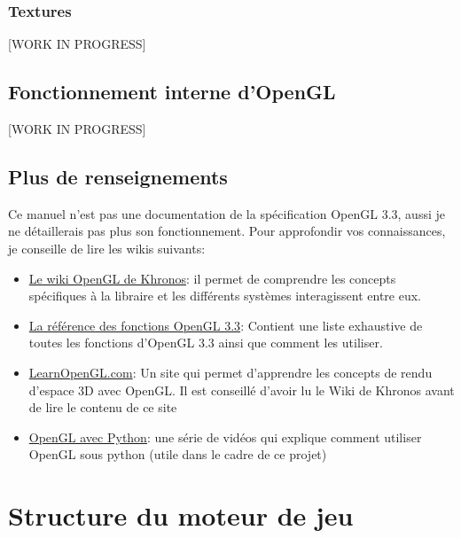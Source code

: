 \documentclass[a4paper,10pt]{article}
\begin{document}
\subsubsection{Textures}
[WORK IN PROGRESS]

\subsection{Fonctionnement interne d'OpenGL}
[WORK IN PROGRESS]

\subsection{Plus de renseignements}
Ce manuel n'est pas une documentation de la spécification OpenGL 3.3, aussi je ne détaillerais pas plus son fonctionnement. Pour approfondir vos connaissances, je conseille de lire les wikis suivants:
\begin{itemize}
 \item \href{https://www.khronos.org/opengl/wiki/}{Le wiki OpenGL de Khronos}: il permet de comprendre les concepts spécifiques à la libraire et les différents systèmes interagissent entre eux.
 \item \href{http://www.hyzgame.org.cn/OpenGL/man3/bottom.php}{La référence des fonctions OpenGL 3.3}: Contient une liste exhaustive de toutes les fonctions d'OpenGL 3.3 ainsi que comment les utiliser.
 \item \href{https://learnopengl.com}{LearnOpenGL.com}: Un site qui permet d'apprendre les concepts de rendu d'espace 3D avec OpenGL. Il est conseillé d'avoir lu le Wiki de Khronos avant de lire le contenu de ce site
 \item \href{https://www.youtube.com/playlist?list=PLn3eTxaOtL2PDnEVNwOgZFm5xYPr4dUoR}{OpenGL avec Python}: une série de vidéos qui explique comment utiliser OpenGL sous python (utile dans le cadre de ce projet)
\end{itemize}


\section{Structure du moteur de jeu}
\end{document}
